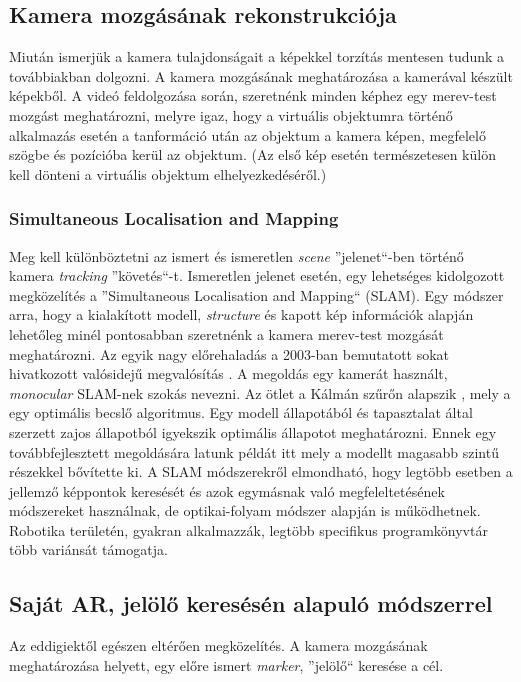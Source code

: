 \documentclass[12pt,a4paper,oneside]{report} %
\begin{document}
\subsection{Kamera mozgásának rekonstrukciója}
Miután ismerjük a kamera tulajdonságait a képekkel torzítás mentesen tudunk a továbbiakban dolgozni.
A kamera mozgásának meghatározása a kamerával készült képekből. A videó feldolgozása során, szeretnénk minden képhez egy merev-test mozgást meghatározni, melyre igaz, hogy a virtuális objektumra történő alkalmazás esetén a tanformáció után az objektum a kamera képen, megfelelő szögbe és pozícióba kerül az objektum. (Az első kép esetén természetesen külön kell dönteni a virtuális objektum elhelyezkedéséről.)

\subsubsection{Simultaneous Localisation and Mapping}
Meg kell különböztetni az ismert és ismeretlen \textit{scene} ''jelenet``-ben történő kamera \textit{tracking} ''követés``-t. Ismeretlen jelenet esetén, egy lehetséges kidolgozott megközelítés a ''Simultaneous Localisation and Mapping`` (SLAM). Egy módszer arra, hogy a kialakított modell, \textit{structure} és kapott kép információk alapján lehetőleg minél pontosabban szeretnénk a kamera merev-test mozgását meghatározni.
Az egyik nagy előrehaladás a 2003-ban bemutatott sokat hivatkozott valósidejű megvalósítás \cite{davison2003real}. A megoldás egy kamerát használt, \textit{monocular} SLAM-nek szokás nevezni. 
Az ötlet a Kálmán szűrőn alapszik \cite{welch1995introduction}, mely a egy optimális becslő algoritmus. Egy modell állapotából és tapasztalat által szerzett zajos állapotból igyekszik optimális állapotot meghatározni. Ennek egy továbbfejlesztett megoldására latunk példát itt \cite{klein2008improving} mely a modellt magasabb szintű részekkel bővítette ki. A SLAM módszerekről elmondható, hogy legtöbb esetben a jellemző képpontok keresését és azok egymásnak való megfeleltetésének módszereket használnak, de optikai-folyam módszer alapján is működhetnek. 
Robotika területén, gyakran alkalmazzák, legtöbb specifikus programkönyvtár több variánsát támogatja.

\subsection{Saját AR, jelölő keresésén alapuló módszerrel}
Az eddigiektől egészen eltérően megközelítés. A kamera mozgásának meghatározása helyett, egy előre ismert \textit{marker}, ''jelölő``  keresése a cél. 
\end{document}
